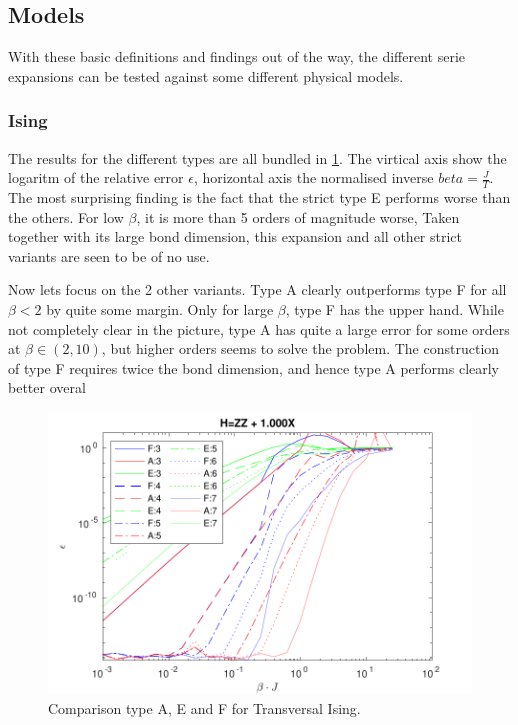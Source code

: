 \subsection{Models}

With these basic definitions and findings out of the way, the different serie expansions can be tested against some different physical models.

\subsubsection{Ising}

The results for the different types are all bundled in \cref{fig:benchmark:tising}. The virtical axis show the logaritm of the relative error $\epsilon$, horizontal axis the normalised inverse $beta= \frac{J}{T}$. The most surprising finding is the fact that the strict type E performs worse than the others. For low $\beta$, it is more than 5 orders of magnitude worse, Taken together with its large bond dimension, this expansion  and all other strict variants are seen to be of no use.

Now lets focus on the 2 other variants. Type A clearly outperforms type F for all $\beta<2$ by quite some margin. Only for large $\beta$, type F has the upper hand. While not completely clear in the picture, type A has quite a large error for some orders at $\beta \in (2,10) $, but higher orders seems to solve the problem. The construction of type F requires twice the bond dimension, and hence type A performs clearly better overal

\begin{figure}
    \center
    \includegraphics[width=\textwidth]{Figuren/benchmarking/t_ising.pdf}
    \caption{Comparison type A, E and F for Transversal Ising. }
    \label{fig:benchmark:tising}
\end{figure}

